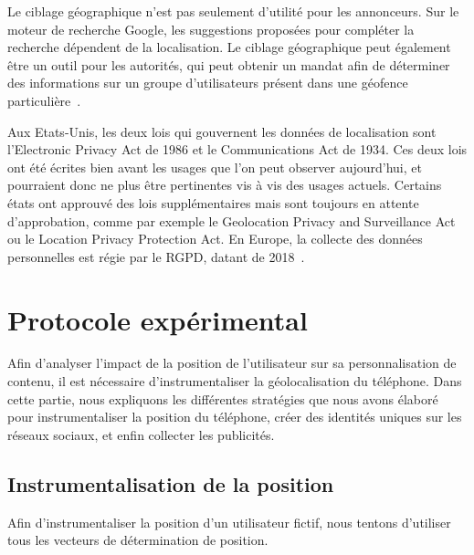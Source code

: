\documentclass[runningheads]{llncs}
\begin{document}
Le ciblage géographique n'est pas seulement d'utilité pour les annonceurs. Sur le moteur de recherche Google, les suggestions proposées pour compléter la recherche dépendent de la localisation. Le ciblage géographique peut également être un outil pour les autorités, qui peut obtenir un mandat afin de déterminer des informations sur un groupe d'utilisateurs présent dans une géofence particulière~\cite{ng_how_nodate}.


Aux Etats-Unis, les deux lois qui gouvernent les données de localisation sont l'Electronic Privacy Act de
1986 et le Communications Act de 1934. Ces deux lois ont été écrites bien avant les usages que l'on peut observer aujourd'hui, et pourraient donc ne plus être pertinentes vis à vis des usages actuels. Certains états ont approuvé des lois supplémentaires mais sont toujours en attente d'approbation, comme par exemple le Geolocation Privacy and Surveillance Act ou le Location Privacy Protection Act. En Europe, la collecte des données personnelles est régie par le RGPD, datant de 2018~\cite{karanja_unintended_2018}.


\section{Protocole expérimental}

Afin d'analyser l'impact de la position de l'utilisateur sur sa personnalisation de contenu, il est nécessaire d'instrumentaliser la géolocalisation du téléphone. 
Dans cette partie, nous expliquons les différentes stratégies que nous avons élaboré pour instrumentaliser la position du téléphone, créer des identités uniques sur les réseaux sociaux, et enfin collecter les publicités.


\subsection{Instrumentalisation de la position}\label{instrumentalisation_position}

Afin d'instrumentaliser la position d'un utilisateur fictif, nous tentons d'utiliser tous les vecteurs de détermination de position.
\end{document}
